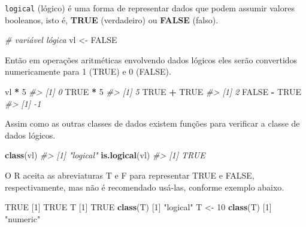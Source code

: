 \documentclass[]{book}
\newenvironment{Shaded}{\begin{snugshade}}{\end{snugshade}}
\newcommand{\KeywordTok}[1]{\textcolor[rgb]{0.13,0.29,0.53}{\textbf{#1}}}
\newcommand{\DecValTok}[1]{\textcolor[rgb]{0.00,0.00,0.81}{#1}}
\newcommand{\StringTok}[1]{\textcolor[rgb]{0.31,0.60,0.02}{#1}}
\newcommand{\CommentTok}[1]{\textcolor[rgb]{0.56,0.35,0.01}{\textit{#1}}}
\newcommand{\OtherTok}[1]{\textcolor[rgb]{0.56,0.35,0.01}{#1}}
\newcommand{\OperatorTok}[1]{\textcolor[rgb]{0.81,0.36,0.00}{\textbf{#1}}}
\newcommand{\NormalTok}[1]{#1}
\begin{document}
\texttt{logical} (lógico) é uma forma de representar dados que podem
assumir valores booleanos, isto é, \textbf{TRUE} (verdadeiro) ou
\textbf{FALSE} (falso).

\begin{Shaded}
\begin{Highlighting}[]
\CommentTok{# variável lógica}
\NormalTok{vl <-}\StringTok{ }\OtherTok{FALSE}
\end{Highlighting}
\end{Shaded}

Então em operações aritméticas envolvendo dados lógicos eles serão
convertidos numericamente para 1 (TRUE) e 0 (FALSE).

\begin{Shaded}
\begin{Highlighting}[]
\NormalTok{vl }\OperatorTok{*}\StringTok{ }\DecValTok{5}
\CommentTok{#> [1] 0}
\OtherTok{TRUE} \OperatorTok{*}\StringTok{ }\DecValTok{5}
\CommentTok{#> [1] 5}
\OtherTok{TRUE} \OperatorTok{+}\StringTok{ }\OtherTok{TRUE}
\CommentTok{#> [1] 2}
\OtherTok{FALSE} \OperatorTok{-}\StringTok{ }\OtherTok{TRUE}
\CommentTok{#> [1] -1}
\end{Highlighting}
\end{Shaded}

Assim como as outras classes de dados existem funções para verificar a
classe de dados lógicos.

\begin{Shaded}
\begin{Highlighting}[]
\KeywordTok{class}\NormalTok{(vl)}
\CommentTok{#> [1] "logical"}
\KeywordTok{is.logical}\NormalTok{(vl)}
\CommentTok{#> [1] TRUE}
\end{Highlighting}
\end{Shaded}

O R aceita as abreviaturas T e F para representar TRUE e FALSE,
respectivamente, mas não é recomendado usá-las, conforme exemplo abaixo.

\begin{Shaded}
\begin{Highlighting}[]
\OtherTok{TRUE}
\NormalTok{[}\DecValTok{1}\NormalTok{] }\OtherTok{TRUE}
\NormalTok{T}
\NormalTok{[}\DecValTok{1}\NormalTok{] }\OtherTok{TRUE}
\KeywordTok{class}\NormalTok{(T)}
\NormalTok{[}\DecValTok{1}\NormalTok{] }\StringTok{"logical"}
\NormalTok{T <-}\StringTok{ }\DecValTok{10}
\KeywordTok{class}\NormalTok{(T)}
\NormalTok{[}\DecValTok{1}\NormalTok{] }\StringTok{"numeric"}
\end{Highlighting}
\end{Shaded}
\end{document}
